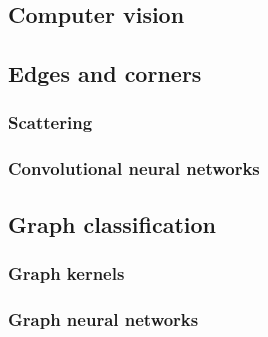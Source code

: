     \subsection{Computer vision}
        \subsection{Edges and corners}
        \subsubsection{Scattering}
        \subsubsection{Convolutional neural networks}
    \subsection{Graph classification}
        \subsubsection{Graph kernels}
        \subsubsection{Graph neural networks}
